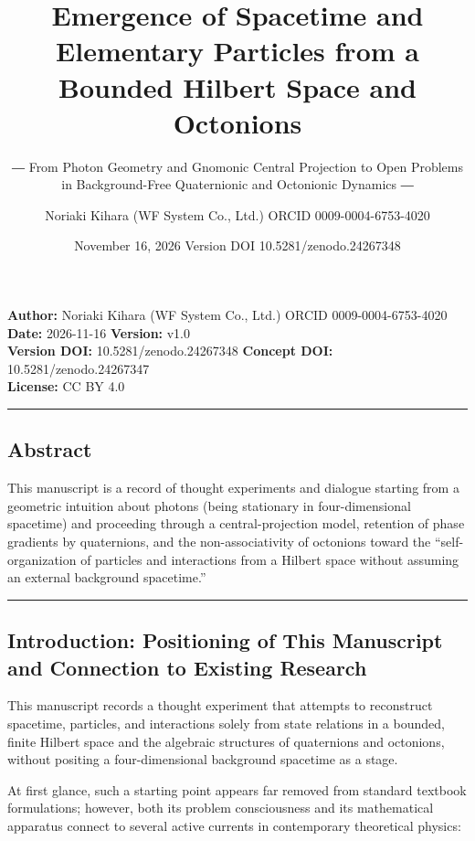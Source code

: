 \documentclass[
  a4paper,
]{article}
\title{Emergence of Spacetime and Elementary Particles from a Bounded
Hilbert Space and Octonions}
\subtitle{― From Photon Geometry and Gnomonic Central Projection to Open
Problems in Background-Free Quaternionic and Octonionic Dynamics ―}
\author{Noriaki Kihara (WF System Co., Ltd.) ORCID 0009-0004-6753-4020}
\date{November 16, 2026 Version DOI 10.5281/zenodo.24267348}
\begin{document}
\maketitle

\textbf{Author:} Noriaki Kihara (WF System Co., Ltd.) ORCID
0009-0004-6753-4020\\
\textbf{Date:} 2026-11-16 \textbf{Version:} v1.0\\
\textbf{Version DOI:} 10.5281/zenodo.24267348 \textbf{Concept DOI:}
10.5281/zenodo.24267347\\
\textbf{License:} CC BY 4.0

\begin{center}\rule{0.5\linewidth}{0.5pt}\end{center}

\subsection{Abstract}\label{abstract}

This manuscript is a record of thought experiments and dialogue starting
from a geometric intuition about photons (being stationary in
four-dimensional spacetime) and proceeding through a central-projection
model, retention of phase gradients by quaternions, and the
non-associativity of octonions toward the ``self-organization of
particles and interactions from a Hilbert space without assuming an
external background spacetime.''

\begin{center}\rule{0.5\linewidth}{0.5pt}\end{center}

\subsection{Introduction: Positioning of This Manuscript and Connection
to Existing
Research}\label{introduction-positioning-of-this-manuscript-and-connection-to-existing-research}

This manuscript records a thought experiment that attempts to
reconstruct spacetime, particles, and interactions solely from state
relations in a bounded, finite Hilbert space and the algebraic
structures of quaternions and octonions, without positing a
four-dimensional background spacetime as a stage.

At first glance, such a starting point appears far removed from standard
textbook formulations; however, both its problem consciousness and its
mathematical apparatus connect to several active currents in
contemporary theoretical physics:
\end{document}
